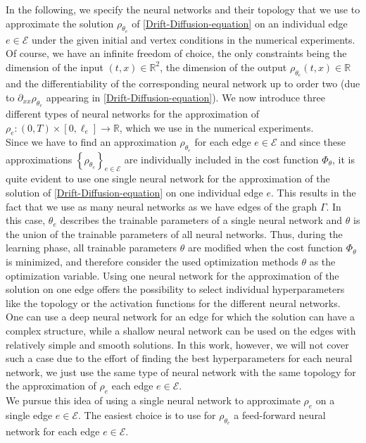 In the following, we specify the neural networks and their topology that we use to approximate the solution $\rho_{\theta_e}$ of \cref{Drift-Diffusion-equation} on an individual edge $e \in \mathcal{E}$ under the given initial and vertex conditions in the numerical experiments. Of course, we have an infinite freedom of choice, the only constraints being the dimension of the input $\left(t, x\right) \in \mathbb{R}^2$, the dimension of the output $\rho_{\theta_e}\left(t, x\right) \in \mathbb{R}$ and the differentiability of the corresponding neural network up to order two (due to $\partial_{xx} \rho_{\theta_e}$ appearing in \cref{Drift-Diffusion-equation}). We now introduce three different types of neural networks for the approximation of $\rho_e \colon \left(0, T\right) \times \left[0, \ell_e\right] \to \mathbb{R}$, which we use in the numerical experiments. \\
Since we have to find an approximation $\rho_{\theta_e}$ for each edge $e \in \mathcal{E}$ and since these approximations $\left\{ \rho_{\theta_e} \right\}_{e \in \mathcal{E}}$ are individually included in the cost function $\Phi_{\theta}$, it is quite evident to use one single neural network for the approximation of the solution of \cref{Drift-Diffusion-equation} on one individual edge $e$. This results in the fact that we use as many neural networks as we have edges of the graph $\Gamma$. In this case, $\theta_e$ describes the trainable parameters of a single neural network and $\theta$ is the union of the trainable parameters of all neural networks. Thus, during the learning phase, all trainable parameters $\theta$ are modified when the cost function $\Phi_{\theta}$ is minimized, and therefore consider the used optimization methods $\theta$ as the optimization variable. Using one neural network for the approximation of the solution on one edge offers the possibility to select individual hyperparameters like the topology or the activation functions for the different neural networks. One can use a deep neural network for an edge for which the solution can have a complex structure, while a shallow neural network can be used on the edges with relatively simple and smooth solutions. In this work, however, we will not cover such a case due to the effort of finding the best hyperparameters for each neural network, we just use the same type of neural network with the same topology for the approximation of $\rho_e$ each edge $e \in \mathcal{E}$. \\

We pursue this idea of using a single neural network to approximate $\rho_e$ on a single edge $e \in \mathcal{E}$. The easiest choice is to use for $\rho_{\theta_e}$ a feed-forward neural network for each edge $e \in \mathcal{E}$.

